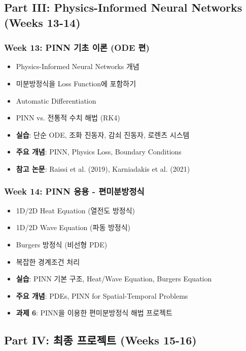 \documentclass[11pt,a4paper]{article}
\begin{document}
\subsection{Part III: Physics-Informed Neural Networks (Weeks 13-14)}

\subsubsection*{Week 13: PINN 기초 이론 (ODE 편)}
\begin{itemize}[noitemsep]
    \item Physics-Informed Neural Networks 개념
    \item 미분방정식을 Loss Function에 포함하기
    \item Automatic Differentiation
    \item PINN vs. 전통적 수치 해법 (RK4)
    \item \textbf{실습}: 단순 ODE, 조화 진동자, 감쇠 진동자, 로렌츠 시스템
    \item \textbf{주요 개념}: PINN, Physics Loss, Boundary Conditions
    \item \textbf{참고 논문}: Raissi et al. (2019), Karniadakis et al. (2021)
\end{itemize}

\subsubsection*{Week 14: PINN 응용 - 편미분방정식}
\begin{itemize}[noitemsep]
    \item 1D/2D Heat Equation (열전도 방정식)
    \item 1D/2D Wave Equation (파동 방정식)
    \item Burgers 방정식 (비선형 PDE)
    \item 복잡한 경계조건 처리
    \item \textbf{실습}: PINN 기본 구조, Heat/Wave Equation, Burgers Equation
    \item \textbf{주요 개념}: PDEs, PINN for Spatial-Temporal Problems
    \item \textbf{과제 6}: PINN을 이용한 편미분방정식 해법 프로젝트
\end{itemize}

\subsection{Part IV: 최종 프로젝트 (Weeks 15-16)}
\end{document}
